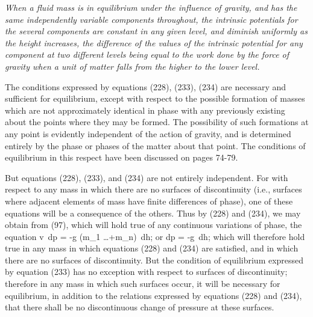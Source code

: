 \documentclass[12pt]{memoir}
\begin{document}
\textit{When a fluid mass is in equilibrium under the influence of gravity, and has the same independently variable components throughout, the intrinsic potentials for the several components are constant in any given level, and diminish uniformly as the height increases, the difference of the values of the intrinsic potential for any component at two different levels being equal to the work done by the force of gravity when a unit of matter falls from the higher to the lower level.}


The conditions expressed by equations (228), (233), (234) are necessary and sufficient for equilibrium, except with respect to the possible formation of masses which are not approximately identical in phase with any previously existing about the points where they may be formed. The possibility of such formations at any point is evidently independent of the action of gravity, and is determined entirely by the phase or phases of the matter about that point. The conditions of equilibrium in this respect have been discussed on pages 74-79.


But equations (228), (233), and (234) are not entirely independent. For with respect to any mass in which there are no surfaces of discontinuity (i.e., surfaces where adjacent elements of mass have finite differences of phase), one of these equations will be a consequence of the others. Thus by (228) and (234), we may obtain from (97), which will hold true of any continuous variations of phase, the equation
\eqs v \,dp = -g (m_1 \dots +m_n) \,dh;  \label{235}\eqe
or
\eqs     dp = -g \gamma \,dh;  \label{236}\eqe
which will therefore hold true in any mass in which equations (228) and (234) are satisfied, and in which there are no surfaces of discontinuity. But the condition of equilibrium expressed by equation (233) has no exception with respect to surfaces of discontinuity; therefore in any mass in which such surfaces occur, it will be necessary for equilibrium, in addition to the relations expressed by equations (228) and (234), that there shall be no discontinuous change of pressure at these surfaces.
\end{document}
